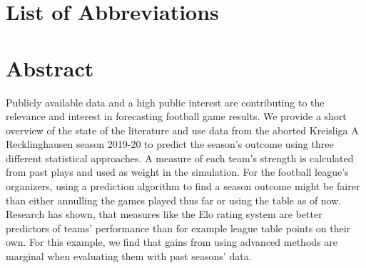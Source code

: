 \documentclass[12pt,a4paper]{article}
\begin{document}
\newpage
\listoffigures
{}

\listoftables
{}

\section*{List of Abbreviations}

\begin{adjustwidth}{1.5em}{0pt}

\begin{acronym}[dummyyyy]


\end{acronym}

\end{adjustwidth}

\restoregeometry

\newpage
{}
\hypertarget{abstract}{%
\section{Abstract}\label{abstract}}

Publicly available data and a high public interest are contributing to
the relevance and interest in forecasting football game results. We
provide a short overview of the state of the literature and use data
from the aborted Kreisliga A Recklinghausen season 2019-20 to predict
the season's outcome using three different statistical approaches. A
measure of each team's strength is calculated from past plays and used
as weight in the simulation. For the football league's organizers, using
a prediction algorithm to find a season outcome might be fairer than
either annulling the games played thus far or using the table as of now.
Research has shown, that measures like the Elo rating system are better
predictors of teams' performance than for example league table points on
their own. For this example, we find that gains from using advanced
methods are marginal when evaluating them with past seasons' data.
\end{document}
